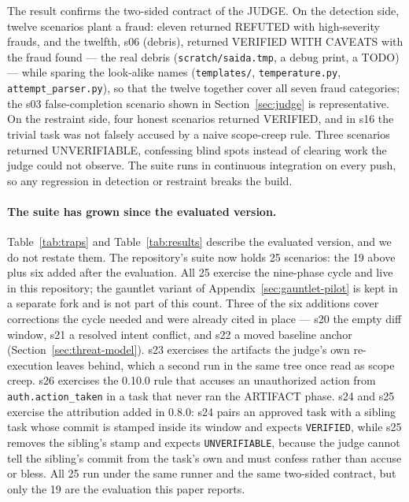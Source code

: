 \documentclass{sbc2019}%
\begin{document}
The result confirms the two-sided contract of the JUDGE. On the detection
side, twelve scenarios plant a fraud: eleven returned REFUTED with
high-severity frauds, and the twelfth, s06 (debris), returned VERIFIED
WITH CAVEATS with the fraud found --- the real debris
(\texttt{scratch/saida.tmp}, a debug print, a TODO) --- while sparing the
look-alike names (\texttt{templates/}, \texttt{temperature.py},
\texttt{attempt\_parser.py}), so that the twelve together cover all seven
fraud categories; the s03 false-completion scenario shown in
Section~\ref{sec:judge} is representative. On the restraint side, four
honest scenarios returned VERIFIED, and in s16 the trivial task was not
falsely accused by a naive scope-creep rule. Three scenarios returned
UNVERIFIABLE, confessing blind spots instead of clearing work the judge
could not observe. The suite runs in continuous integration on every push,
so any regression in detection or restraint breaks the build.

\paragraph{The suite has grown since the evaluated version.}
Table~\ref{tab:traps} and Table~\ref{tab:results} describe the evaluated
version, and we do not restate them. The repository's suite now holds 25
scenarios: the 19 above plus six added after the evaluation. All 25 exercise
the nine-phase cycle and live in this repository; the gauntlet variant of
Appendix~\ref{sec:gauntlet-pilot} is kept in a separate fork and is not part
of this count. Three of the six additions cover corrections the cycle needed
and were already cited in place --- s20 the empty diff window, s21 a resolved
intent conflict, and s22 a moved baseline anchor
(Section~\ref{sec:threat-model}). s23 exercises the artifacts the judge's own
re-execution leaves behind, which a second run in the same tree once read as
scope creep. s26 exercises the 0.10.0 rule that accuses an unauthorized action from \texttt{auth.action\_taken} in a task that never ran the ARTIFACT phase. s24 and s25 exercise the attribution added in 0.8.0: s24 pairs
an approved task with a sibling task whose commit is stamped inside its
window and expects \texttt{VERIFIED}, while s25 removes the sibling's stamp
and expects \texttt{UNVERIFIABLE}, because the judge cannot tell the
sibling's commit from the task's own and must confess rather than accuse or
bless. All 25 run under the same runner and the same two-sided contract, but
only the 19 are the evaluation this paper reports.
\end{document}
